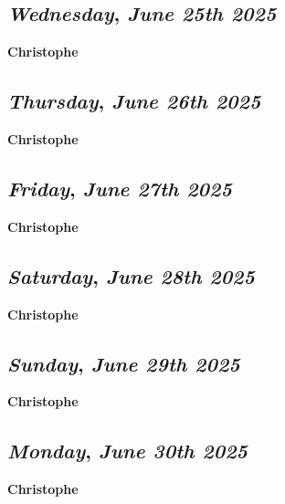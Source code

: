 \def\day{\textit{June 25th 2025}}
\def\weekday{\textit{Wednesday}}
\subsection*{\weekday, \day}
\textbf {Christophe}

\def\day{\textit{June 26th 2025}}
\def\weekday{\textit{Thursday}}
\subsection*{\weekday, \day}
\textbf {Christophe}

\def\day{\textit{June 27th 2025}}
\def\weekday{\textit{Friday}}
\subsection*{\weekday, \day}
\textbf {Christophe}

\def\day{\textit{June 28th 2025}}
\def\weekday{\textit{Saturday}}
\subsection*{\weekday, \day}
\textbf {Christophe}

\def\day{\textit{June 29th 2025}}
\def\weekday{\textit{Sunday}}
\subsection*{\weekday, \day}
\textbf {Christophe}

\def\day{\textit{June 30th 2025}}
\def\weekday{\textit{Monday}}
\subsection*{\weekday, \day}
\textbf {Christophe}
